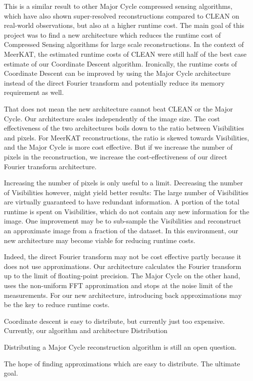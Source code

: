 This is a similar result to other Major Cycle compressed sensing algorithms, which have also shown super-resolved reconstructions compared to CLEAN on real-world observations\cite{dabbech2018cygnus}\cite{girard2015sparse}, but also at a higher runtime cost. The main goal of this project was to find a new architecture which reduces the runtime cost of Compressed Sensing algorithms for large scale reconstructions. In the context of MeerKAT, the estimated runtime costs of CLEAN were still half of the best case estimate of our Coordinate Descent algorithm. Ironically, the runtime costs of Coordinate Descent can be improved by using the Major Cycle architecture instead of the direct Fourier transform and potentially reduce its memory requirement as well.

That does not mean the new architecture cannot beat CLEAN or the Major Cycle. Our architecture scales independently of the image size. The cost effectiveness of the two architectures boils down to the ratio between Visibilities and pixels. For MeerKAT reconstructions, the ratio is skewed towards Visibilities, and the Major Cycle is more cost effective. But if we increase the number of pixels in the reconstruction, we increase the cost-effectiveness of our direct Fourier transform architecture.

Increasing the number of pixels is only useful to a limit. Decreasing the number of Visibilities however, might yield better results: The large number of Visibilities are virtually guaranteed to have redundant information. A portion of the total runtime is spent on Visibilities, which do not contain any new information for the image. One improvement may be to sub-sample the Visibilities and reconstruct an approximate image from a fraction of the dataset. In this environment, our new architecture may become viable for reducing runtime costs.

Indeed, the direct Fourier transform may not be cost effective partly because it does not use approximations. Our architecture calculates the Fourier transform up to the limit of floating-point precision. The Major Cycle on the other hand, uses the non-uniform FFT approximation and stops at the noise limit of the measurements. For our new architecture, introducing back approximations may be the key to reduce runtime costs.

Coordinate descent is easy to distribute, but currently just too expensive. 
Currently, our algorithm and architecture
Distribution

Distributing a Major Cycle reconstruction algorithm is still an open question.

The hope of finding approximations which are easy to distribute. The ultimate goal.





 